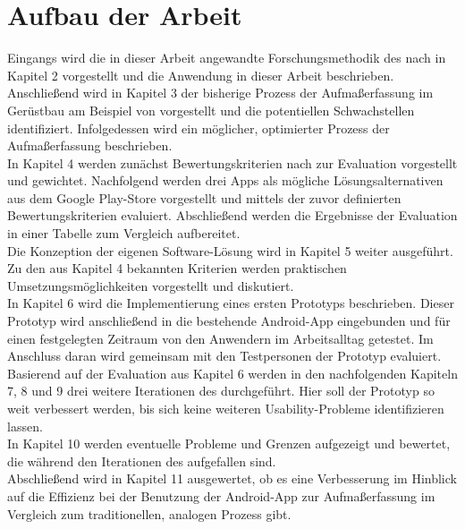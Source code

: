 \section{Aufbau der Arbeit}
Eingangs wird die in dieser Arbeit angewandte Forschungsmethodik des \hcdp{} nach \citet{Norman13} in Kapitel 2 vorgestellt und die Anwendung in dieser Arbeit beschrieben. \\

Anschließend wird in Kapitel 3 der bisherige Prozess der Aufmaßerfassung im Gerüstbau am Beispiel von \vr{} vorgestellt und die potentiellen Schwachstellen identifiziert. 
Infolgedessen wird ein möglicher, optimierter Prozess der Aufmaßerfassung beschrieben. \\

In Kapitel 4 werden zunächst Bewertungskriterien nach \citet{Nielsen94} zur Evaluation vorgestellt und gewichtet.
Nachfolgend werden drei Apps als mögliche Lösungsalternativen aus dem Google Play-Store vorgestellt und mittels der zuvor definierten Bewertungskriterien evaluiert.
Abschließend werden die Ergebnisse der Evaluation in einer Tabelle zum Vergleich aufbereitet. \\

Die Konzeption der eigenen Software-Lösung wird in Kapitel 5 weiter ausgeführt.
Zu den aus Kapitel 4 bekannten Kriterien werden praktischen Umsetzungsmöglichkeiten vorgestellt und diskutiert. \\

In Kapitel 6 wird die Implementierung eines ersten Prototyps beschrieben.
Dieser Prototyp wird anschließend in die bestehende Android-App eingebunden und für einen festgelegten Zeitraum von den Anwendern im Arbeitsalltag getestet.
Im Anschluss daran wird gemeinsam mit den Testpersonen der Prototyp evaluiert. \\

Basierend auf der Evaluation aus Kapitel 6 werden in den nachfolgenden Kapiteln 7, 8 und 9 drei weitere Iterationen des \hcdp{} durchgeführt.
Hier soll der Prototyp so weit verbessert werden, bis sich keine weiteren Usability-Probleme identifizieren lassen. \\

In Kapitel 10 werden eventuelle Probleme und Grenzen aufgezeigt und bewertet, die während den Iterationen des \hcdp{} aufgefallen sind. \\

Abschließend wird in Kapitel 11 ausgewertet, ob es eine Verbesserung im Hinblick auf die Effizienz bei der Benutzung der Android-App zur Aufmaßerfassung im Vergleich zum traditionellen, analogen Prozess gibt.
